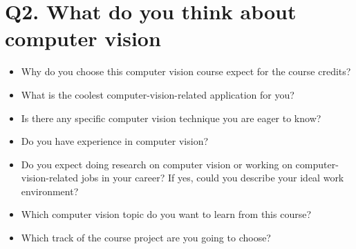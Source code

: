 \documentclass{article}
\begin{document}
\section*{Q2. What do you think about computer vision}
\begin{itemize}
    \item Why do you choose this computer vision course expect for the course credits?
    
    \item What is the coolest computer-vision-related application for you?

    \item Is there any specific computer vision technique you are eager to know? 

    \item Do you have experience in computer vision?

    \item Do you expect doing research on computer vision or working on computer-vision-related jobs in your career? If yes, could you describe your ideal work environment?

    \item Which computer vision topic do you want to learn from this course?

    \item Which track of the course project are you going to choose?

\end{itemize}




\end{document}
